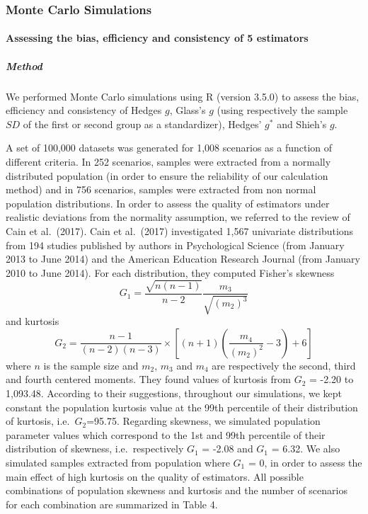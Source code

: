 \documentclass[
  english,
  man]{apa6}
\let\oldparagraph\paragraph
\renewcommand{\paragraph}[1]{\oldparagraph{#1}\mbox{}}
\let\oldsubparagraph\subparagraph
\renewcommand{\subparagraph}[1]{\oldsubparagraph{#1}\mbox{}}
\begin{document}
\hypertarget{monte-carlo-simulations}{%
\subsubsection{Monte Carlo Simulations}\label{monte-carlo-simulations}}

\hypertarget{assessing-the-bias-efficiency-and-consistency-of-5-estimators}{%
\paragraph{Assessing the bias, efficiency and consistency of 5 estimators}\label{assessing-the-bias-efficiency-and-consistency-of-5-estimators}}

\hypertarget{method}{%
\subparagraph{Method}\label{method}}

We performed Monte Carlo simulations using R (version 3.5.0) to assess the bias, efficiency and consistency of Hedges \(g\), Glass's \(g\) (using respectively the sample \(SD\) of the first or second group as a standardizer), Hedges' \(g^*\) and Shieh's \(g\).

A set of 100,000 datasets was generated for 1,008 scenarios as a function of different criteria. In 252 scenarios, samples were extracted from a normally distributed population (in order to ensure the reliability of our calculation method) and in 756 scenarios, samples were extracted from non normal population distributions. In order to assess the quality of estimators under realistic deviations from the normality assumption, we referred to the review of Cain et al.~(2017). Cain et al.~(2017) investigated 1,567 univariate distributions from 194 studies published by authors in Psychological Science (from January 2013 to June 2014) and the American Education Research Journal (from January 2010 to June 2014). For each distribution, they computed Fisher's skewness
\[G_{1}=\frac{\sqrt{n(n-1)}}{n-2} \frac{m_{3}}{\sqrt{(m_{2})^3}}\]
and kurtosis \[G_{2}=\frac{n-1}{(n-2)(n-3)}\times \left[(n+1)\left(\frac{m_{4}}{(m_{2})^2}-3\right)+6\right]\]
where \(n\) is the sample size and \(m_{2}\), \(m_{3}\) and \(m_{4}\) are respectively the second, third and fourth centered moments. They found values of kurtosis from \(G_2\) = -2.20 to 1,093.48. According to their suggestions, throughout our simulations, we kept constant the population kurtosis value at the 99th percentile of their distribution of kurtosis, i.e.~\(G_2\)=95.75. Regarding skewness, we simulated population parameter values which correspond to the 1st and 99th percentile of their distribution of skewness, i.e.~respectively \(G_1\) = -2.08 and \(G_1\) = 6.32. We also simulated samples extracted from population where \(G_1\) = 0, in order to assess the main effect of high kurtosis on the quality of estimators. All possible combinations of population skewness and kurtosis and the number of scenarios for each combination are summarized in Table 4.
\end{document}
